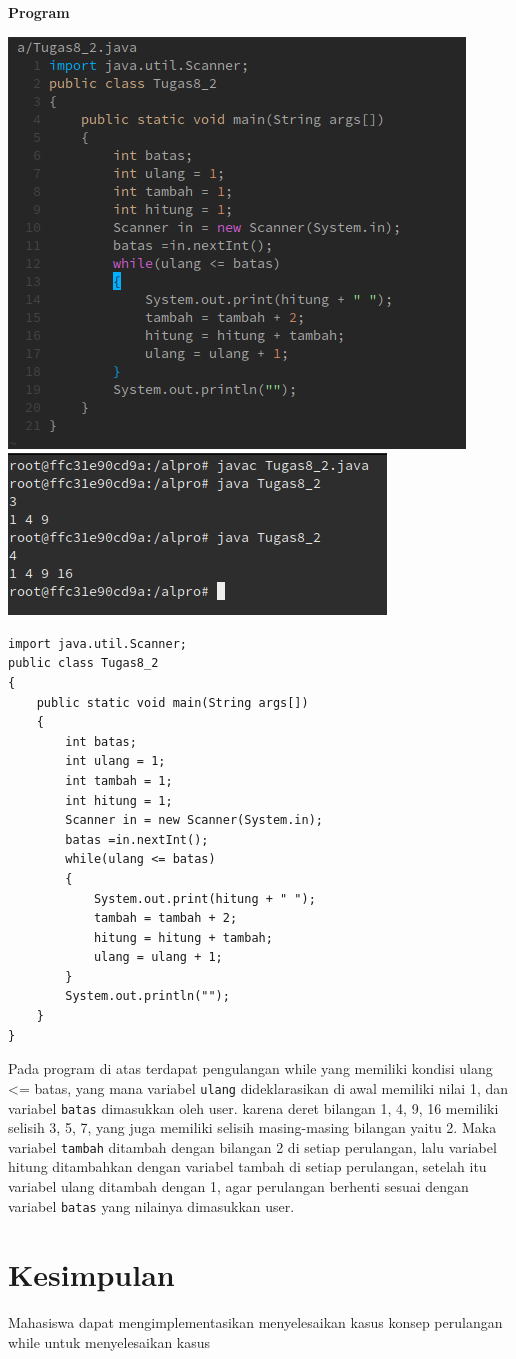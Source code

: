 \documentclass[a4paper,12pt]{article}
\begin{document}
\newpage
{\bfseries Program\\}
\begin{center}
	\includegraphics[scale=.8]{tugas8-2}\\[5ex]
	\includegraphics[scale=.7]{tugas-8-2-1}
\end{center}
\newpage
\begin{lstlisting}[frame=single]
import java.util.Scanner;
public class Tugas8_2
{
    public static void main(String args[])
    {
        int batas;
        int ulang = 1;
        int tambah = 1;
        int hitung = 1;
        Scanner in = new Scanner(System.in);
        batas =in.nextInt();
        while(ulang <= batas)
        {
            System.out.print(hitung + " ");
            tambah = tambah + 2;
            hitung = hitung + tambah;
            ulang = ulang + 1;
        }
        System.out.println("");
    }
}
\end{lstlisting}

Pada program di atas terdapat pengulangan while yang memiliki kondisi ulang <= batas, yang mana variabel \texttt{ulang} dideklarasikan di awal memiliki nilai 1, dan variabel \texttt{batas} dimasukkan oleh user.
karena deret bilangan 1, 4, 9, 16 memiliki selisih 3, 5, 7, yang juga memiliki selisih masing-masing bilangan yaitu 2. Maka variabel \texttt{tambah} ditambah dengan bilangan 2 di setiap perulangan, lalu variabel hitung ditambahkan dengan variabel tambah di setiap perulangan, setelah itu variabel ulang ditambah dengan 1, agar perulangan berhenti sesuai dengan variabel \texttt{batas} yang nilainya dimasukkan user.

\newpage
\section{Kesimpulan}
Mahasiswa dapat mengimplementasikan menyelesaikan kasus konsep perulangan while untuk menyelesaikan kasus
\end{document}
